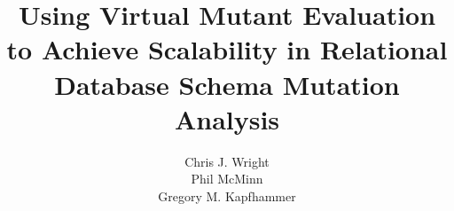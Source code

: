 \documentclass{sig-alternate}
\begin{document}


\title{Using Virtual Mutant Evaluation to Achieve Scalability in Relational Database Schema Mutation Analysis \vspace*{-.1in}}




\author{
\alignauthor
Chris J. Wright\\
\alignauthor
Phil McMinn\\
\alignauthor
Gregory M. Kapfhammer\\
}

\maketitle













\end{document}
